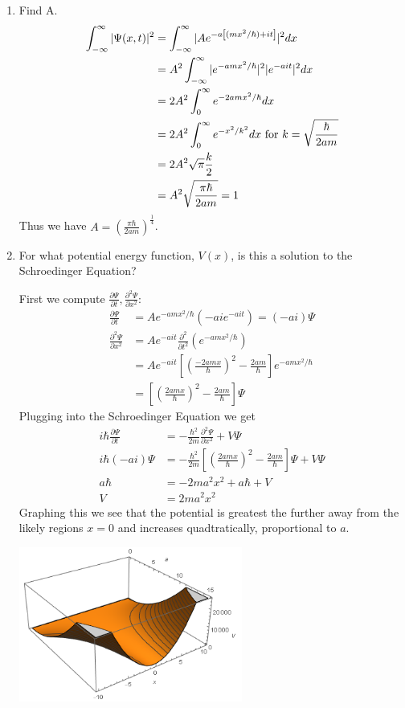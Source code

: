 \documentclass{article}
\newcommand{\ddt}[1]{\frac{\partial #1}{\partial t}}
\newcommand{\dddx}[1]{\frac{\partial^2 #1}{\partial x^2}}
\newcommand{\bracket}[1]{\left[ #1 \right]}
\newcommand{\paren}[1]{\left( #1 \right)}
\begin{document}
\begin{enumerate}[label=(\alph*)]
  \item Find A.
    \begin{align*}
      \intinf |\Psi(x,t)|^2 &= \intinf |Ae^{-a\bracket{(mx^2/\hbar) + it}}|^2 dx \\
                            &=  A^2\intinf |e^{-amx^2/\hbar}|^2 |e^{-ait}|^2 dx \\
                            &= 2A^2 \intzinf e^{-2amx^2/\hbar}dx \\
                            &= 2A^2 \intzinf e^{-x^2/k^2}dx \text{ for } k = \sqrt{\frac\hbar{2am}} \\
                            &= 2A^2 \sqrt{\pi} \frac{k}{2} \\
                            &= A^2 \sqrt{\frac{\pi\hbar}{2am}} = 1
    \end{align*}
    Thus we have $A = \paren{\frac{\pi\hbar}{2am}}^{\frac14}$.
  \item For what potential energy function, $V(x)$, is this a solution to the Schroedinger Equation?
    
    First we compute \(\ddt{\Psi},\dddx{\Psi}\):
    \begin{align*}
      \ddt{\Psi}  &= Ae^{-amx^2/\hbar}\paren{-aie^{-ait}} = (-ai)\Psi \\
      \dddx{\Psi} &= Ae^{-ait}\frac{\partial^2}{\partial t^2} \paren{e^{-amx^2/\hbar}} \\
                  &= Ae^{-ait} \bracket{ \paren{\frac{-2amx}{\hbar}}^2 - \frac{2am}{\hbar}} e^{-amx^2/\hbar}  \\
                  &= \bracket{\paren{\frac{2amx}{\hbar}}^2 - \frac{2am}{\hbar}} \Psi
    \end{align*}
    Plugging into the Schroedinger Equation we get
    \begin{align*}
        i\hbar\ddt{\Psi} &= -\frac{\hbar^2}{2m}\dddx{\Psi} + V \Psi \\
        i\hbar(-ai){\Psi} &= -\frac{\hbar^2}{2m}\bracket{\paren{\frac{2amx}{\hbar}}^2 -  \frac{2am}{\hbar}}\Psi + V \Psi \\
                  a\hbar &= -2ma^2x^2 + a\hbar + V \\
                  V &= 2ma^2x^2
    \end{align*}
    Graphing this we see that the potential is greatest the further away from the likely regions \(x=0\) and increases quadtratically, proportional to \(a\).
    \centerline{\includegraphics[height=2in]{1-9b.png}}


\end{enumerate}
\end{document}
